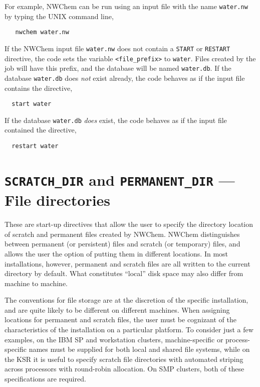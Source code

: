 For example, NWChem can be run using an input file with the name 
\verb+water.nw+ 
by typing the UNIX command line,

\begin{verbatim}
   nwchem water.nw
\end{verbatim}

If the NWChem input file \verb+water.nw+ does not contain
a \verb+START+  or \verb+RESTART+ directive, the code
sets the variable {\tt <file\_prefix>} to {\tt water}.  Files created
by the job will have this prefix, and the database will be named
{\tt water.db}.  If the database \verb+water.db+ does {\em not} exist already,
the code behaves as if the input file contains the directive,

\begin{verbatim}
  start water
\end{verbatim}

If the database \verb+water.db+ {\em does} exist,
the code behaves as if the input file contained the directive,

\begin{verbatim}
  restart water
\end{verbatim}


\section{{\tt SCRATCH\_DIR} and {\tt PERMANENT\_DIR} --- File directories}
\label{sec:dirs}

These are start-up directives that allow the user to specify the
directory location of scratch and permanent files created by NWChem.
NWChem distinguishes between permanent (or persistent) files and
scratch (or temporary) files, and allows the user the option of
putting them in different locations.  In most installations, however,
permanent and scratch files are all written to the current directory
by default.  What constitutes ``local'' disk space may also differ from 
machine to machine.

The conventions for file storage are at the discretion of the specific 
installation, and are quite likely to be different on different machines.  
When assigning locations for permanent and
scratch files,
the user must be cognizant of the characteristics of the installation
on a particular platform.
To consider just a few examples, on the IBM SP 
and workstation clusters, machine-specific or process-specific
names must be supplied for both local and shared file
systems, while on the KSR it is useful to specify scratch file directories
with automated striping across processors with round-robin allocation.
On SMP clusters, both of these specifications are required.  


